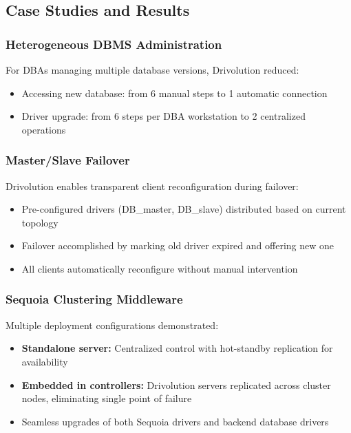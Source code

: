 \subsection{Case Studies and Results}

\subsubsection{Heterogeneous DBMS Administration}

For DBAs managing multiple database versions, Drivolution reduced:
\begin{itemize}
    \item Accessing new database: from 6 manual steps to 1 automatic connection
    \item Driver upgrade: from 6 steps per DBA workstation to 2 centralized operations
\end{itemize}

\subsubsection{Master/Slave Failover}

Drivolution enables transparent client reconfiguration during failover:
\begin{itemize}
    \item Pre-configured drivers (DB\_master, DB\_slave) distributed based on current topology
    \item Failover accomplished by marking old driver expired and offering new one
    \item All clients automatically reconfigure without manual intervention
\end{itemize}

\subsubsection{Sequoia Clustering Middleware}

Multiple deployment configurations demonstrated:
\begin{itemize}
    \item \textbf{Standalone server:} Centralized control with hot-standby replication for availability
    \item \textbf{Embedded in controllers:} Drivolution servers replicated across cluster nodes, eliminating single point of failure
    \item Seamless upgrades of both Sequoia drivers and backend database drivers
\end{itemize}

